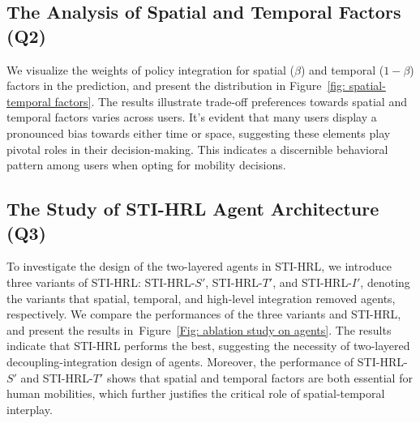 \documentclass[letterpaper]{article} %
\begin{document}
\subsection{The Analysis of Spatial and Temporal Factors (Q2)} 
We visualize the weights of policy integration for spatial ($\beta$) and temporal ($1-\beta$) factors in the prediction, and present the distribution in 
Figure~\ref{fig: spatial-temporal factors}. 
The results illustrate trade-off preferences towards spatial and temporal factors varies across users. 
It's evident that many users display a pronounced bias towards either time or space, suggesting these elements play pivotal roles in their decision-making. This indicates a discernible behavioral pattern among users when opting for mobility decisions.

\subsection{The Study of STI-HRL Agent Architecture (Q3)} 
To investigate the design of the two-layered agents in STI-HRL, we introduce three variants of STI-HRL:  STI-HRL-$S'$, STI-HRL-$T'$, and STI-HRL-$I'$, denoting the variants that spatial, temporal, and high-level integration removed agents, respectively. 
We compare the performances of the three variants and STI-HRL,  and present the results in~Figure~\ref{Fig: ablation study on agents}. 
The results indicate that STI-HRL performs the best, suggesting the necessity of two-layered decoupling-integration design of agents. 
Moreover, the performance of STI-HRL-$S'$ and STI-HRL-$T'$ shows that spatial and temporal factors are both essential for human mobilities, which further justifies the critical role of spatial-temporal interplay.
\end{document}
